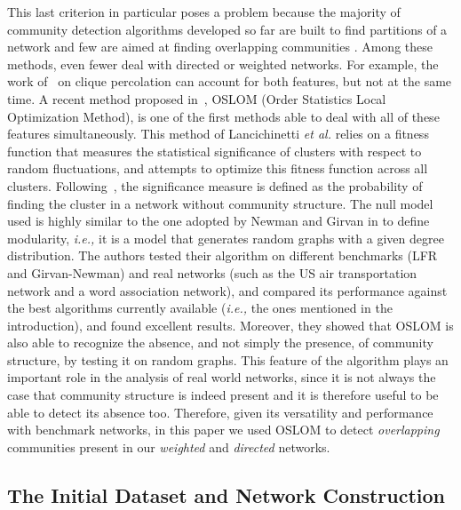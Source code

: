 This last criterion in particular poses a problem because the majority of community detection algorithms developed so far are built to find partitions of a network and few are aimed at finding overlapping communities \cite{Aicher26062014,BaumesGKMP05,PalEtAl05,ZhaWanZha07,Gre07,PhysRevE.77.016107,Lancichinetti2009,PhysRevE.80.016105,Kovacs2010}. Among these methods, even fewer deal with directed or weighted networks. For example, the work of~\cite{PalEtAl05} on clique percolation can account for both features, but not at the same time. A recent method proposed in~\cite{LancichinettiPlos}, OSLOM (Order Statistics Local Optimization Method), is one of the first methods  able to deal with all of these features simultaneously. This method of Lancichinetti \emph{et al.} relies on a fitness function that measures the statistical significance of clusters with respect to random fluctuations, and attempts to optimize this fitness function across all clusters. 
Following~\cite{LancichinettiPlos}, the significance measure is defined as the probability of finding the cluster in a network without community structure. The null model used is highly similar to the one adopted by Newman and Girvan in \cite{newman2004finding} to define modularity, {\it i.e.,} it is a model that generates random graphs with a given degree distribution. The authors tested their algorithm on different benchmarks (LFR and Girvan-Newman) and real networks (such as the US air transportation network and a word association network), and compared its performance against the best algorithms
currently available ({\it i.e.,} the ones mentioned in the introduction), and found excellent results. Moreover, they showed that OSLOM is also able to recognize the absence, and not simply the presence, of community structure, by testing it on random graphs. This feature of the algorithm plays an important role in the analysis of real world networks, since it is not always the case that community structure is indeed present and it is therefore useful to be able to detect its absence too. 
Therefore, given its versatility and performance with benchmark networks, in this paper we used OSLOM to detect \emph{overlapping} communities present in our \emph{weighted} and \emph{directed} networks.

\subsection{The Initial Dataset and Network Construction}

